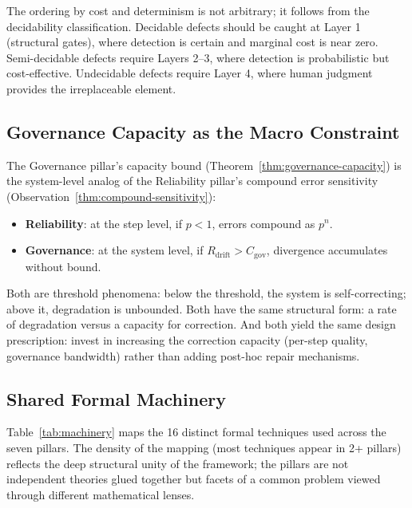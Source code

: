 \documentclass[11pt, a4paper]{googledeepmind}
\begin{document}
The ordering by cost and determinism is not arbitrary; it follows from the decidability classification. Decidable defects should be caught at Layer 1 (structural gates), where detection is certain and marginal cost is near zero. Semi-decidable defects require Layers 2--3, where detection is probabilistic but cost-effective. Undecidable defects require Layer 4, where human judgment provides the irreplaceable element.

\subsection{Governance Capacity as the Macro Constraint}

The Governance pillar's capacity bound (Theorem~\ref{thm:governance-capacity}) is the system-level analog of the Reliability pillar's compound error sensitivity (Observation~\ref{thm:compound-sensitivity}):

\begin{itemize}[nosep]
    \item \textbf{Reliability}: at the step level, if $p < 1$, errors compound as $p^n$.
    \item \textbf{Governance}: at the system level, if $R_{\text{drift}} > C_{\text{gov}}$, divergence accumulates without bound.
\end{itemize}

Both are threshold phenomena: below the threshold, the system is self-correcting; above it, degradation is unbounded. Both have the same structural form: a rate of degradation versus a capacity for correction. And both yield the same design prescription: invest in increasing the correction capacity (per-step quality, governance bandwidth) rather than adding post-hoc repair mechanisms.

\subsection{Shared Formal Machinery}
\label{sec:shared-machinery}

Table~\ref{tab:machinery} maps the 16 distinct formal techniques used across the seven pillars. The density of the mapping (most techniques appear in 2+ pillars) reflects the deep structural unity of the framework; the pillars are not independent theories glued together but facets of a common problem viewed through different mathematical lenses.
\end{document}
